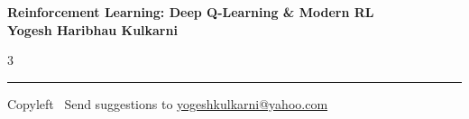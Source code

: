 \documentclass[8pt,landscape]{article}
\begin{document}
\footnotesize


\begin{center}
\Large{\textbf{Reinforcement Learning: Deep Q-Learning \& Modern RL\\ Yogesh Haribhau Kulkarni}}
\end{center}

\begin{multicols}{3}

\end{multicols}

\rule{\linewidth}{0.25pt}
\scriptsize
Copyleft \textcopyleft\  Send suggestions to
\href{http://www.yogeshkulkarni.com}{yogeshkulkarni@yahoo.com}
\end{document}
